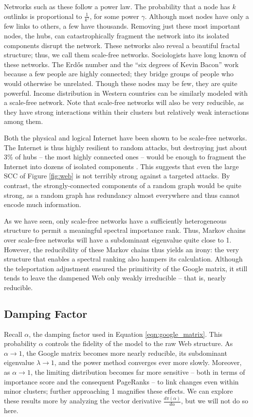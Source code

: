 \documentclass[../exploring-pagerank.tex]{subfiles}
\begin{document}
    Networks such as these follow a power law. The probability that a node has $k$ outlinks is proportional to $\frac{1}{k^\gamma}$, for some power $\gamma$. Although most nodes have only a few links to others, a few have thousands. Removing just these most important nodes, the hubs, can catastrophically fragment the network into its isolated components disrupt the network. These networks also reveal a beautiful fractal structure; thus, we call them scale-free networks. Sociologists have long known of these networks. The Erdős number and the ``six degrees of Kevin Bacon'' work because a few people are highly connected; they bridge groups of people who would otherwise be unrelated. Though these nodes may be few, they are quite powerful. Income distribution in Western countries can be similarly modeled with a scale-free network. Note that scale-free networks will also be very reducible, as they have strong interactions within their clusters but relatively weak interactions among them.
    
    Both the physical and logical Internet have been shown to be scale-free networks. The Internet is thus highly resilient to random attacks, but destroying just about 3\% of hubs -- the most highly connected ones -- would be enough to fragment the Internet into dozens of isolated components \cite{barabasiNetworkScienceScaleFree}. This suggests that even the large SCC of Figure \ref{fig:web} is not terribly strong against a targeted attacks. By contrast, the strongly-connected components of a random graph would be quite strong, as a random graph has redundancy almost everywhere and thus cannot encode much information.
    
    As we have seen, only scale-free networks have a sufficiently heterogeneous structure to permit a meaningful spectral importance rank. Thus, Markov chains over scale-free networks will have a subdominant eigenvalue quite close to 1. However, the reducibility of these Markov chains thus yields an irony: the very structure that enables a spectral ranking also hampers its calculation. Although the teleportation adjustment ensured the primitivity of the Google matrix, it still tends to leave the dampened Web only weakly irreducible -- that is, nearly reducible. 

    \subsection{Damping Factor}
    Recall $\alpha$, the damping factor used in Equation \eqref{eqn:google_matrix}. This probability $\alpha$ controls the fidelity of the model to the raw Web structure. As $\alpha \to 1$, the Google matrix becomes more nearly reducible, its subdominant eigenvalue $\lambda \to 1$, and the power method converges ever more slowly. Moreover, as $\alpha \to 1$, the limiting distribution becomes far more sensitive -- both in terms of importance score and the consequent PageRanks -- to link changes even within minor clusters; further approaching 1 magnifies these effects. We can explore these results more by analyzing the vector derivative $\frac{d\pi(\alpha)}{d\alpha}$, but we will not do so here.
    
\end{document}
